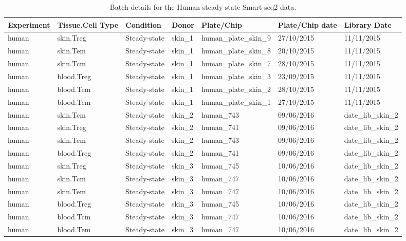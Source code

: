 \begin{table}[ht!]
\scriptsize
\caption[Batch details for the Human steady-state Smart-seq2 data]{Batch details for the Human steady-state Smart-seq2 data.}
\centering
\label{table:tab_A_batch_human}
\begin{tabular}{lllllll}
  \toprule
Experiment & Tissue.Cell Type & Condition & Donor & Plate/Chip & Plate/Chip date & Library Date \\ 
  \midrule
  human & skin.Treg & Steady-state & skin\_1 & human\_plate\_skin\_9 & 27/10/2015 & 11/11/2015 \\ 
  human & skin.Tem & Steady-state & skin\_1 & human\_plate\_skin\_8 & 20/10/2015 & 11/11/2015 \\ 
  human & skin.Tcm & Steady-state & skin\_1 & human\_plate\_skin\_7 & 28/10/2015 & 11/11/2015 \\ 
  human & blood.Treg & Steady-state & skin\_1 & human\_plate\_skin\_3 & 23/09/2015 & 11/11/2015 \\ 
  human & blood.Tem & Steady-state & skin\_1 & human\_plate\_skin\_2 & 28/10/2015 & 11/11/2015 \\ 
  human & blood.Tcm & Steady-state & skin\_1 & human\_plate\_skin\_1 & 27/10/2015 & 11/11/2015 \\ 
  human & skin.Tcm & Steady-state & skin\_2 & human\_743 & 09/06/2016 & date\_lib\_skin\_2 \\ 
  human & skin.Treg & Steady-state & skin\_2 & human\_741 & 09/06/2016 & date\_lib\_skin\_2 \\ 
  human & skin.Tem & Steady-state & skin\_2 & human\_743 & 09/06/2016 & date\_lib\_skin\_2 \\ 
  human & blood.Treg & Steady-state & skin\_2 & human\_741 & 09/06/2016 & date\_lib\_skin\_2 \\ 
  human & skin.Treg & Steady-state & skin\_3 & human\_745 & 10/06/2016 & date\_lib\_skin\_2 \\ 
  human & skin.Tcm & Steady-state & skin\_3 & human\_747 & 10/06/2016 & date\_lib\_skin\_2 \\ 
  human & skin.Tem & Steady-state & skin\_3 & human\_747 & 10/06/2016 & date\_lib\_skin\_2 \\ 
  human & blood.Treg & Steady-state & skin\_3 & human\_745 & 10/06/2016 & date\_lib\_skin\_2 \\ 
  human & blood.Tcm & Steady-state & skin\_3 & human\_747 & 10/06/2016 & date\_lib\_skin\_2 \\ 
  human & blood.Tem & Steady-state & skin\_3 & human\_747 & 10/06/2016 & date\_lib\_skin\_2 \\ 

\end{tabular}
\end{table}
